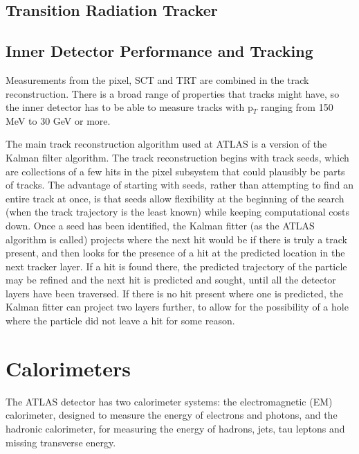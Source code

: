 \documentclass[11pt]{article}
\begin{document}
\subsection{Transition Radiation Tracker}



 
\subsection{Inner Detector Performance and Tracking}
Measurements from the pixel, SCT and TRT are combined in the track reconstruction.  There is a broad range of properties that tracks might have, so the inner detector has to be able to measure tracks with p$_T$ ranging from 150 MeV to 30 GeV or more.   

The main track reconstruction algorithm used at ATLAS is a version of the Kalman filter algorithm.  The track reconstruction begins with track seeds, which are collections of a few hits in the pixel subsystem that could plausibly be parts of tracks.  The advantage of starting with seeds, rather than attempting to find an entire track at once, is that seeds allow flexibility at the beginning of the search (when the track trajectory is the least known) while keeping computational costs down.  Once a seed has been identified, the Kalman fitter (as the ATLAS algorithm is called) projects where the next hit would be if there is truly a track present, and then looks for the presence of a hit at the predicted location in the next tracker layer.  If a hit is found there, the predicted trajectory of the particle may be refined and the next hit is predicted and sought, until all the detector layers have been traversed. If there is no hit present where one is predicted, the Kalman fitter can project two layers further, to allow for the possibility of a hole where the particle did not leave a hit for some reason. 

\section{Calorimeters}
The ATLAS detector has two calorimeter systems: the electromagnetic (EM) calorimeter, designed to measure the energy of electrons and photons, and the hadronic calorimeter, for measuring the energy of hadrons, jets, tau leptons and missing transverse energy.  

\end{document}
